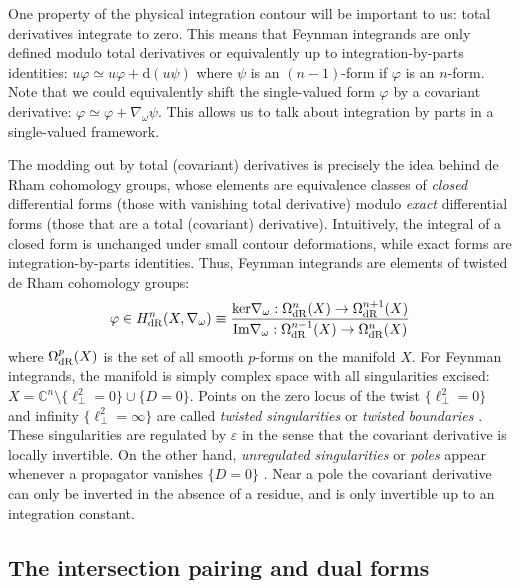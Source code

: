 \documentclass[11pt]{article}
\renewcommand{\d}{\text{d}}
\newcommand{\Space}{\Cbb^n\setminus \{\ell_\perp^2=0\} \cup \{D=0\}}
\newcommand{\Cbb}{\mathbb{C}}
\newcommand{\im}{{\rm Im}}
\renewcommand{\ker}{{\rm ker}}
\newcommand{\dr}{{\rm dR}}
\newcommand{\vphi}{\varphi}
\newcommand{\vep}{\varepsilon}
\begin{document}
One property of the physical integration contour will be important to us: total derivatives integrate to zero.
This means that Feynman integrands are only defined modulo total derivatives or equivalently up to integration-by-parts identities: $u \vphi \simeq u \vphi + \d(u \psi)$ where $\psi$ is an $(n{-}1)$-form if $\vphi$ is an $n$-form.  
Note that we could equivalently shift the single-valued form $\vphi$ by a covariant derivative: $\vphi\simeq\vphi+\nabla_{\omega}\psi$. This allows us to talk about integration by parts in a single-valued framework.

The modding out by total (covariant) derivatives is precisely the idea behind de Rham cohomology groups, whose elements
are equivalence classes of \emph{closed} differential forms (those with vanishing total derivative) modulo \emph{exact} differential forms (those that are a total (covariant) derivative). Intuitively, the integral of a closed form is unchanged under small contour deformations, while exact forms are integration-by-parts identities. 
Thus, Feynman integrands are elements of twisted de Rham cohomology groups: 
\begin{align}
	\vphi \in H^n_\dr(X,\nabla_\omega) 
	\equiv \frac{
		\ker \nabla_\omega: \Omega^n_\dr(X) \to \Omega^{n+1}_\dr(X)
	}{
		\im \nabla_\omega: \Omega^{n-1}_\dr(X) \to \Omega^{n}_\dr(X)
	}
\end{align}
where $\Omega^p_\dr(X)$ is the set of all smooth $p$-forms on the manifold $X$. For Feynman integrands, the manifold is simply complex space with all singularities excised: $X = \Space$. Points on the zero locus of the twist $\{\ell_\perp^2=0\}$ and infinity $\{\ell_\perp^2=\infty\}$ are called \emph{twisted singularities} or \emph{twisted boundaries} \cite{Mastrolia:2018uzb, Frellesvig:2019kgj, Frellesvig:2019uqt, Mizera:2019vvs, Mizera:2020wdt, Frellesvig:2020qot, Caron-Huot:2021xqj}.
These singularities are regulated by $\vep$ in the sense that the covariant derivative is locally invertible. On the other hand, \emph{unregulated singularities} or \emph{poles} appear whenever a propagator vanishes $\{D=0\}$ \cite{Matsumoto:2018aa, Mizera:2020wdt,Caron-Huot:2021xqj}. Near a pole the covariant derivative can only be inverted in the absence of a residue, and is only invertible up to an integration constant. 

\subsection{The intersection pairing and dual forms}
\end{document}
